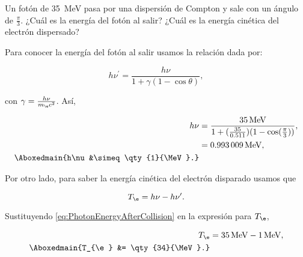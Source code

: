 \documentclass[./../main.tex]{subfiles}
\begin{document}
    \begin{exercise}
        Un fotón de \qty{35}{\MeV} pasa por una dispersión de Compton y sale con un ángulo de \(\tfrac{\pi}{3}\). ¿Cuál es la energía del fotón al salir? ¿Cuál es la energía cinética del electrón dispersado?

        \begin{solution}
            Para conocer la energía del fotón al salir usamos la relación dada por:

            \begin{equation*}
                h\nu^{\prime} = \dfrac{h\nu}{1 + \gamma(1 - \cos\theta)},
            \end{equation*}

            con \(\gamma = \tfrac{h\nu}{m_{\e}c^{2}}\). Así,

            \begin{align}
                h\nu &= \dfrac{\qty{35}{\MeV}}{1 + (\tfrac{35}{0.511})(1 - \cos(\tfrac{\pi}{3}))}\nonumber,\\
                &= \qty{0.993009}{\MeV},\nonumber\\
                \Aboxedmain{h\nu &\simeq \qty{1}{\MeV}.}\label{eq:PhotonEnergyAfterCollision}
            \end{align}

            Por otro lado, para saber la energía cinética del electrón disparado usamos que

            \begin{equation*}
                T_{\e} = h\nu - h\nu^{\prime}.
            \end{equation*}

            Sustituyendo \cref{eq:PhotonEnergyAfterCollision} en la expresión para \(T_{\e}\),

            \begin{align*}
                T_{\e} &= \qty{35}{\MeV} - \qty{1}{\MeV},\\
                \Aboxedmain{T_{\e} &= \qty{34}{\MeV}.}
            \end{align*}
        \end{solution}
    \end{exercise}
\end{document}

